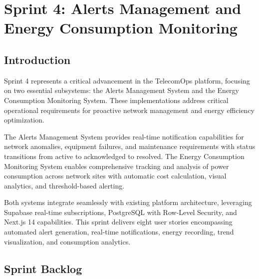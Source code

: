 \chapter{Sprint 4: Alerts Management and Energy Consumption Monitoring}

\section{Introduction}

Sprint 4 represents a critical advancement in the TelecomOps platform, focusing on two essential subsystems: the Alerts Management System and the Energy Consumption Monitoring System. These implementations address critical operational requirements for proactive network management and energy efficiency optimization.

The Alerts Management System provides real-time notification capabilities for network anomalies, equipment failures, and maintenance requirements with status transitions from active to acknowledged to resolved. The Energy Consumption Monitoring System enables comprehensive tracking and analysis of power consumption across network sites with automatic cost calculation, visual analytics, and threshold-based alerting.

Both systems integrate seamlessly with existing platform architecture, leveraging Supabase real-time subscriptions, PostgreSQL with Row-Level Security, and Next.js 14 capabilities. This sprint delivers eight user stories encompassing automated alert generation, real-time notifications, energy recording, trend visualization, and consumption analytics.

\section{Sprint Backlog}

